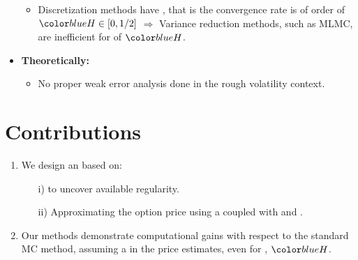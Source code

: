 \documentclass[ima, 20pt, portrait, plainboxedsections]{sciposter}
\begin{document}
\begin{multicols}{3}
\begin{itemize}
\begin{itemize}
\item 	Discretization methods have , that is the convergence rate is of order of $\blue{H} \in[0,1/2]$ \cite{neuenkirch2016order} $\Rightarrow$ Variance reduction methods, such as MLMC, are inefficient for  of $\blue{H}$.
	\end{itemize}

\item \textbf{Theoretically:} 
\begin{itemize}
\item No proper weak error analysis done in the rough volatility
context.
\end{itemize}
\end{itemize}
\section*{Contributions}
\begin{enumerate}		
		\item We design an  based on:
		\begin{enumerate}
			\item[i)]   to uncover available regularity.
			\item[ii)] Approximating the option price using a  coupled with  and .
		\end{enumerate} 
	\item Our  methods demonstrate  computational gains with respect to the standard MC method, assuming a  in the price estimates, even for , $\blue{H}$.		
		\end{enumerate}

\end{multicols}
\end{document}
